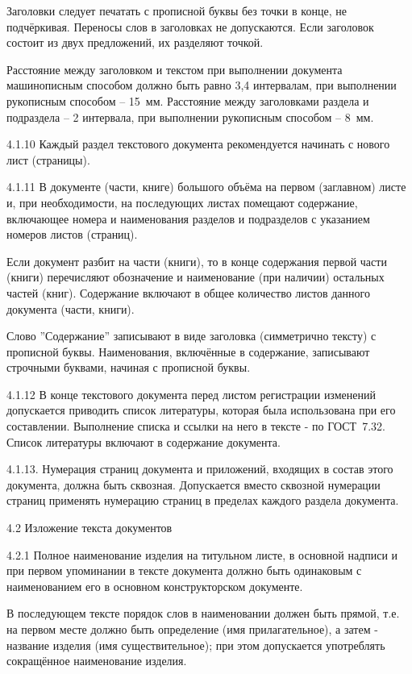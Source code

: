 Заголовки следует печатать с прописной буквы без точки в конце, не подчёркивая. Переносы слов в заголовках не допускаются. Если заголовок состоит из двух предложений, их разделяют точкой.

Расстояние между заголовком и текстом при выполнении документа машинописным способом должно быть равно 3,4 интервалам, при выполнении рукописным способом – 15~мм. Расстояние между заголовками раздела и подраздела – 2 интервала, при выполнении рукописным способом – 8~мм.

4.1.10 Каждый раздел текстового документа рекомендуется начинать с нового лист (страницы).

4.1.11 В документе (части, книге) большого объёма на первом (заглавном) листе и, при необходимости, на последующих листах помещают содержание, включающее номера и наименования разделов и подразделов с указанием номеров листов (страниц).

Если документ разбит на части (книги), то в конце содержания первой части (книги) перечисляют обозначение и наименование (при наличии) остальных частей (книг). Содержание включают в общее количество листов данного документа (части, книги).

Слово ''Содержание'' записывают в виде заголовка (симметрично тексту) с прописной буквы. Наименования, включённые в содержание, записывают строчными буквами, начиная с прописной буквы.

4.1.12 В конце текстового документа перед листом регистрации изменений допускается приводить список литературы, которая была использована при его составлении. Выполнение списка и ссылки на него в тексте - по ГОСТ~7.32. Список литературы включают в содержание документа.

4.1.13. Нумерация страниц документа и приложений, входящих в состав этого документа, должна быть сквозная. Допускается вместо сквозной нумерации страниц применять нумерацию страниц в пределах каждого раздела документа.

4.2 Изложение текста документов

4.2.1 Полное наименование изделия на титульном листе, в основной надписи и при первом упоминании в тексте документа должно быть одинаковым с наименованием его в основном конструкторском документе.

В последующем тексте порядок слов в наименовании должен быть прямой, т.е. на первом месте должно быть определение (имя прилагательное), а затем - название изделия (имя существительное); при этом допускается употреблять сокращённое наименование изделия.


